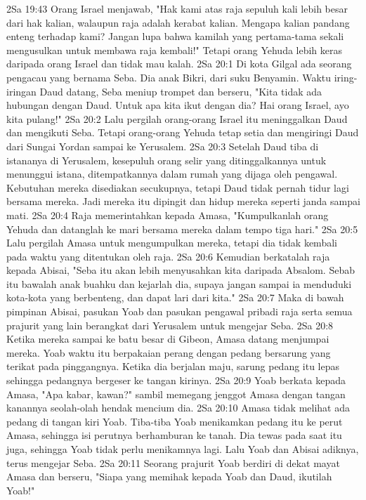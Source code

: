 2Sa 19:43  Orang Israel menjawab, "Hak kami atas raja sepuluh kali lebih besar dari hak kalian, walaupun raja adalah kerabat kalian. Mengapa kalian pandang enteng terhadap kami? Jangan lupa bahwa kamilah yang pertama-tama sekali mengusulkan untuk membawa raja kembali!" Tetapi orang Yehuda lebih keras daripada orang Israel dan tidak mau kalah.
2Sa 20:1  Di kota Gilgal ada seorang pengacau yang bernama Seba. Dia anak Bikri, dari suku Benyamin. Waktu iring-iringan Daud datang, Seba meniup trompet dan berseru, "Kita tidak ada hubungan dengan Daud. Untuk apa kita ikut dengan dia? Hai orang Israel, ayo kita pulang!"
2Sa 20:2  Lalu pergilah orang-orang Israel itu meninggalkan Daud dan mengikuti Seba. Tetapi orang-orang Yehuda tetap setia dan mengiringi Daud dari Sungai Yordan sampai ke Yerusalem.
2Sa 20:3  Setelah Daud tiba di istananya di Yerusalem, kesepuluh orang selir yang ditinggalkannya untuk menunggui istana, ditempatkannya dalam rumah yang dijaga oleh pengawal. Kebutuhan mereka disediakan secukupnya, tetapi Daud tidak pernah tidur lagi bersama mereka. Jadi mereka itu dipingit dan hidup mereka seperti janda sampai mati.
2Sa 20:4  Raja memerintahkan kepada Amasa, "Kumpulkanlah orang Yehuda dan datanglah ke mari bersama mereka dalam tempo tiga hari."
2Sa 20:5  Lalu pergilah Amasa untuk mengumpulkan mereka, tetapi dia tidak kembali pada waktu yang ditentukan oleh raja.
2Sa 20:6  Kemudian berkatalah raja kepada Abisai, "Seba itu akan lebih menyusahkan kita daripada Absalom. Sebab itu bawalah anak buahku dan kejarlah dia, supaya jangan sampai ia menduduki kota-kota yang berbenteng, dan dapat lari dari kita."
2Sa 20:7  Maka di bawah pimpinan Abisai, pasukan Yoab dan pasukan pengawal pribadi raja serta semua prajurit yang lain berangkat dari Yerusalem untuk mengejar Seba.
2Sa 20:8  Ketika mereka sampai ke batu besar di Gibeon, Amasa datang menjumpai mereka. Yoab waktu itu berpakaian perang dengan pedang bersarung yang terikat pada pinggangnya. Ketika dia berjalan maju, sarung pedang itu lepas sehingga pedangnya bergeser ke tangan kirinya.
2Sa 20:9  Yoab berkata kepada Amasa, "Apa kabar, kawan?" sambil memegang jenggot Amasa dengan tangan kanannya seolah-olah hendak mencium dia.
2Sa 20:10  Amasa tidak melihat ada pedang di tangan kiri Yoab. Tiba-tiba Yoab menikamkan pedang itu ke perut Amasa, sehingga isi perutnya berhamburan ke tanah. Dia tewas pada saat itu juga, sehingga Yoab tidak perlu menikamnya lagi. Lalu Yoab dan Abisai adiknya, terus mengejar Seba.
2Sa 20:11  Seorang prajurit Yoab berdiri di dekat mayat Amasa dan berseru, "Siapa yang memihak kepada Yoab dan Daud, ikutilah Yoab!"
